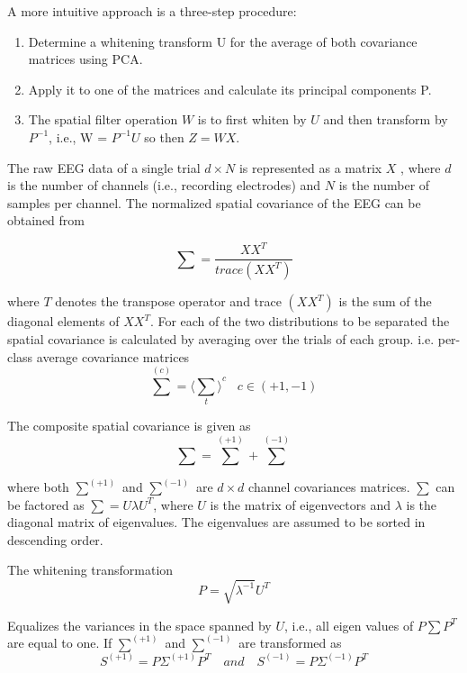 A more intuitive approach is a three-step procedure: 
\begin{enumerate}
\item Determine a whitening transform U for the average of both covariance matrices using PCA.
\item Apply it to one of the matrices and calculate its principal components P.
\item The spatial filter operation $W$ is to first whiten by $U$ and then transform by $P^{-1}$,
i.e., W = $P^{-1} U$ \; so then $Z = WX$.
\end{enumerate}

The raw EEG data of a single trial $d \times N$  is represented as a matrix $X$ , where $d$ is the number of channels (i.e., recording electrodes) and $N$ is the number of samples per channel. The normalized spatial covariance of the EEG can be obtained from

\begin{equation} \label{dtmf1}
 \sum = \frac{XX^{T}}{trace \left({XX^{T}}\right)}
\end{equation}

where $T$ denotes the transpose operator and trace $\left({XX^{T}}\right)$ is the sum of the diagonal elements of $XX^{T}$. For each of the two distributions to be separated the spatial covariance is calculated by averaging over the trials of each group. i.e. per-class average covariance matrices
\begin{equation}
\sum^{\left( c \right)} = {\langle \sum_{t}\rangle}^{c} \; \; \; c \in \left(+1,-1 \right)
\end{equation}

The composite spatial covariance is given as
\begin{equation}
\sum = \sum^{\left( +1 \right)} + \sum^{\left( -1 \right)}
\end{equation}

where both $\sum^{\left( +1 \right)}$ and $\sum^{\left( -1 \right)}$ are $d\times d$ channel covariances matrices.
$\sum$ can be factored as $\sum = U \lambda U^{T}$, where $U$ is the matrix of eigenvectors and $\lambda$  is the diagonal matrix of eigenvalues. The eigenvalues are assumed to be sorted in descending order.

The whitening transformation
\begin{equation}
P = \sqrt{\lambda^{-1}} U^{T}
\end{equation}

Equalizes the variances in the space spanned by $U$, i.e., all eigen values of $P \sum P^{T}$ are equal to one. If $\sum^{\left( +1 \right)}$ and        $\sum^{\left( -1 \right)}$ are transformed as 
 \begin{equation}
 S^{\left( +1\right)} = P \Sigma^{\left( +1 \right)} P^{T} \quad and \quad S^{\left( -1\right)} = P \Sigma^{\left( -1 \right)} P^{T}
 \end{equation}

